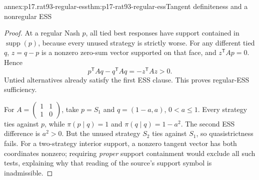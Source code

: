 \begin{annexitem}{annex:p17.rat93-regular-ess}{thm:p17-rat93-regular-ess}{Tangent definiteness and a nonregular ESS}
\begin{proof}
At a regular Nash \(p\), all tied best responses have support
contained in \(\operatorname{supp}(p)\), because every unused
strategy is strictly worse. For any different tied \(q\),
\(z=q-p\) is a nonzero zero-sum vector supported on that face,
and \(z^{\mathsf T}Ap=0\). Hence
\[
 p^{\mathsf T}Aq-q^{\mathsf T}Aq=-z^{\mathsf T}Az>0.
\]
Untied alternatives already satisfy the first ESS clause. This proves
regular-ESS sufficiency.

For \(A=\left(\begin{smallmatrix}1&1\\1&0\end{smallmatrix}\right)\),
take \(p=S_1\) and \(q=(1-a,a)\), \(0<a\leq1\).
Every strategy ties against \(p\), while
\(\pi(p\mid q)=1\) and \(\pi(q\mid q)=1-a^2\).
The second ESS difference is \(a^2>0\). But the unused strategy
\(S_2\) ties against \(S_1\), so quasistrictness fails.
For a two-strategy interior support, a nonzero tangent vector has
both coordinates nonzero; requiring \emph{proper} support containment
would exclude all such tests, explaining why that reading of the
source's support symbol is inadmissible.
\end{proof}
\end{annexitem}


